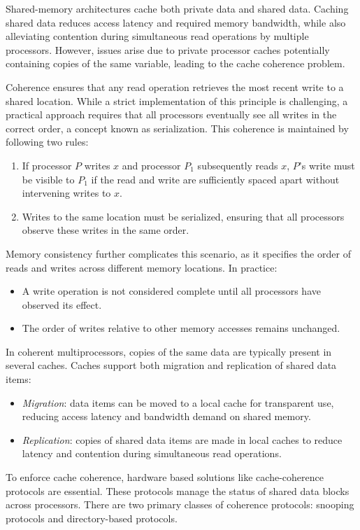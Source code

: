Shared-memory architectures cache both private data and shared data. 
Caching shared data reduces access latency and required memory bandwidth, while also alleviating contention during simultaneous read operations by multiple processors. 
However, issues arise due to private processor caches potentially containing copies of the same variable, leading to the cache coherence problem.

Coherence ensures that any read operation retrieves the most recent write to a shared location.
While a strict implementation of this principle is challenging, a practical approach requires that all processors eventually see all writes in the correct order, a concept known as serialization. 
This coherence is maintained by following two rules:
\begin{enumerate}
    \item If processor $P$ writes $x$ and processor $P_1$ subsequently reads $x$, $P$'s write must be visible to $P_1$ if the read and write are sufficiently spaced apart without intervening writes to $x$.
    \item Writes to the same location must be serialized, ensuring that all processors observe these writes in the same order.
\end{enumerate}
Memory consistency further complicates this scenario, as it specifies the order of reads and writes across different memory locations. 
In practice:
\begin{itemize}
    \item A write operation is not considered complete until all processors have observed its effect.
    \item The order of writes relative to other memory accesses remains unchanged.
\end{itemize}
In coherent multiprocessors, copies of the same data are typically present in several caches.
Caches support both migration and replication of shared data items:
\begin{itemize}
    \item \textit{Migration}: data items can be moved to a local cache for transparent use, reducing access latency and bandwidth demand on shared memory.
    \item \textit{Replication}: copies of shared data items are made in local caches to reduce latency and contention during simultaneous read operations.
\end{itemize}
To enforce cache coherence, hardware based solutions like cache-coherence protocols are essential. 
These protocols manage the status of shared data blocks across processors. 
There are two primary classes of coherence protocols: snooping protocols and directory-based protocols.
